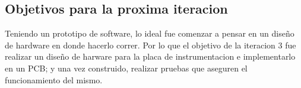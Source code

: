 \subsection{Objetivos para la proxima iteracion} %
\label{it2:sub:objetivos_para_la_proxima_iteracion}

Teniendo un prototipo de software, lo ideal fue comenzar a pensar en un diseño de hardware en donde hacerlo correr. Por lo que el objetivo de la iteracion 3 fue realizar un diseño de harware para la placa de instrumentacion e implementarlo en un PCB; y una vez construido, realizar pruebas que aseguren el funcionamiento del mismo.


